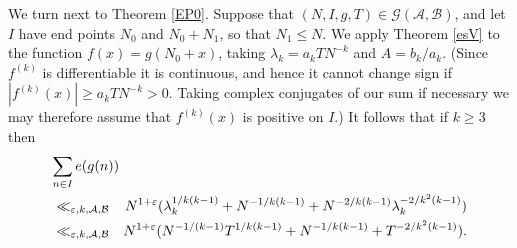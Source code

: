 \documentclass[a4paper,10pt]{article}
\newcommand{\ep}{\varepsilon}
\begin{document}
We turn next to Theorem \ref{EP0}.  Suppose that 
$(N,I,g,T)\in\mathcal{G}(\mathcal{A},\mathcal{B})$, and let $I$ have end points
$N_0$ and $N_0+N_1$, so that $N_1\le N$. We apply Theorem \ref{esV}
to the function $f(x)=g(N_0+x)$, taking $\lambda_k=a_kTN^{-k}$ and
$A=b_k/a_k$. (Since $f^{(k)}$ is differentiable it is continuous, and
hence it cannot change sign if $|f^{(k)}(x)|\ge a_kTN^{-k}>0$. Taking
complex conjugates of our sum if necessary we may therefore assume
that $f^{(k)}(x)$ is positive on $I$.) It follows that if $k\ge 3$ then
\begin{eqnarray*}
\lefteqn{\sum_{n\in I}e(g(n))}\\
&\ll_{\ep,k,\mathcal{A},\mathcal{B}}&
N^{1+\ep}(\lambda_k^{1/k(k-1)}+N^{-1/k(k-1)}+N^{-2/k(k-1)}\lambda_k^{-2/k^2(k-1)})\\
&\ll_{\ep,k,\mathcal{A},\mathcal{B}}&
N^{1+\ep}(N^{-1/(k-1)}T^{1/k(k-1)}+N^{-1/k(k-1)}+T^{-2/k^2(k-1)}).
\end{eqnarray*}
\end{document}
